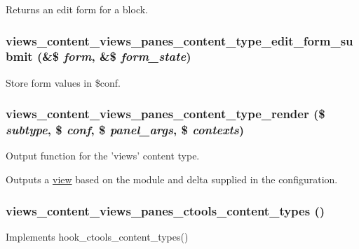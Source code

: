 \label{views__panes_8inc_ac86eb41504d821a677f83530dcd07119}
Returns an edit form for a block. \hypertarget{views__panes_8inc_a08909edfae5e99b7b41c01c053f117f8}{
\subsubsection[{views\_\-content\_\-views\_\-panes\_\-content\_\-type\_\-edit\_\-form\_\-submit}]{\setlength{\rightskip}{0pt plus 5cm}views\_\-content\_\-views\_\-panes\_\-content\_\-type\_\-edit\_\-form\_\-submit (\&\$ {\em form}, \/  \&\$ {\em form\_\-state})}}
\label{views__panes_8inc_a08909edfae5e99b7b41c01c053f117f8}
Store form values in \$conf. \hypertarget{views__panes_8inc_ae1fe2dcd3a3ee733e44ead83786d3870}{
\subsubsection[{views\_\-content\_\-views\_\-panes\_\-content\_\-type\_\-render}]{\setlength{\rightskip}{0pt plus 5cm}views\_\-content\_\-views\_\-panes\_\-content\_\-type\_\-render (\$ {\em subtype}, \/  \$ {\em conf}, \/  \$ {\em panel\_\-args}, \/  \$ {\em contexts})}}
\label{views__panes_8inc_ae1fe2dcd3a3ee733e44ead83786d3870}
Output function for the 'views' content type.

Outputs a \hyperlink{classview}{view} based on the module and delta supplied in the configuration. \hypertarget{views__panes_8inc_a47ae37922a47cd0ce4389ef3ff4dcf13}{
\subsubsection[{views\_\-content\_\-views\_\-panes\_\-ctools\_\-content\_\-types}]{\setlength{\rightskip}{0pt plus 5cm}views\_\-content\_\-views\_\-panes\_\-ctools\_\-content\_\-types ()}}
\label{views__panes_8inc_a47ae37922a47cd0ce4389ef3ff4dcf13}
Implements hook\_\-ctools\_\-content\_\-types() 